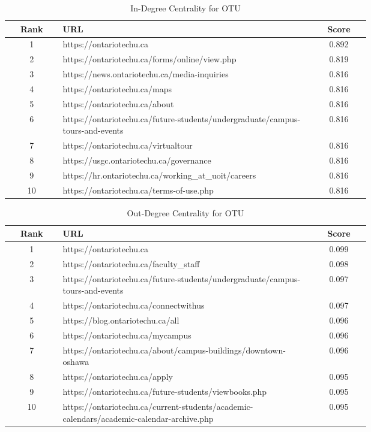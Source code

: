 \begin{table}
    \centering
    \begin{tabular}{|c|p{0.7\linewidth}|c|}
        \hline
        \textbf{Rank} & \textbf{URL} & \textbf{Score} \\
        \hline
        1 & https://ontariotechu.ca & 0.892 \\ \hline
        2 & https://ontariotechu.ca/forms/online/view.php & 0.819 \\ \hline
        3 & https://news.ontariotechu.ca/media-inquiries & 0.816 \\ \hline
        4 & https://ontariotechu.ca/maps & 0.816 \\ \hline
        5 & https://ontariotechu.ca/about & 0.816 \\ \hline
        6 & https://ontariotechu.ca/future-students/undergraduate/campus-tours-and-events & 0.816 \\ \hline
        7 & https://ontariotechu.ca/virtualtour & 0.816 \\ \hline
        8 & https://usgc.ontariotechu.ca/governance & 0.816 \\ \hline
        9 & https://hr.ontariotechu.ca/working\_at\_uoit/careers & 0.816 \\ \hline
        10 & https://ontariotechu.ca/terms-of-use.php & 0.816 \\ \hline
    \end{tabular}
    \caption{In-Degree Centrality for OTU}
    \label{table:in_degree_centrality_otu}
\end{table}

\begin{table}
    \centering
    \begin{tabular}{|c|p{0.7\linewidth}|c|}
        \hline
        \textbf{Rank} & \textbf{URL} & \textbf{Score} \\
        \hline
        1 & https://ontariotechu.ca & 0.099 \\ \hline
        2 & https://ontariotechu.ca/faculty\_staff & 0.098 \\ \hline
        3 & https://ontariotechu.ca/future-students/undergraduate/campus-tours-and-events & 0.097 \\ \hline
        4 & https://ontariotechu.ca/connectwithus & 0.097 \\ \hline
        5 & https://blog.ontariotechu.ca/all & 0.096 \\ \hline
        6 & https://ontariotechu.ca/mycampus & 0.096 \\ \hline
        7 & https://ontariotechu.ca/about/campus-buildings/downtown-oshawa & 0.096 \\ \hline
        8 & https://ontariotechu.ca/apply & 0.095 \\ \hline
        9 & https://ontariotechu.ca/future-students/viewbooks.php & 0.095 \\ \hline
        10 & https://ontariotechu.ca/current-students/academic-calendars/academic-calendar-archive.php & 0.095 \\ \hline
    \end{tabular}
    \caption{Out-Degree Centrality for OTU}
    \label{table:out_degree_centrality_otu}
\end{table}

